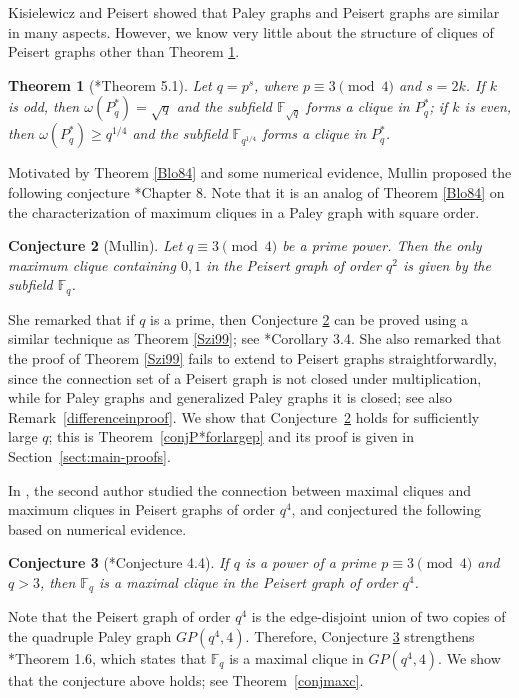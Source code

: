 \documentclass[12pt,reqno]{amsart}
\newtheorem{thm}{Theorem}[section]
\newtheorem{conj}[thm]{Conjecture}
\theoremstyle{definition}
\newcommand{\F}{\mathbb{F}}
\begin{document}
Kisielewicz and Peisert \cite{KP} showed that Paley graphs and Peisert graphs are similar in many aspects. However, we know very little about the structure of cliques of Peisert graphs other than Theorem \ref{KP}.

\begin{thm}[\cite{KP}*{Theorem 5.1}] \label{KP}
Let $q=p^s$, where $p \equiv 3 \pmod 4$ and $s=2k$. If $k$ is odd, then $\omega(P^*_q)= \sqrt{q}$ and the subfield $\F_{\sqrt{q}}$ forms a clique in $P^*_q$; if $k$ is even, then $\omega(P^*_q) \geq q^{1/4}$ and the subfield $\F_{q^{1/4}}$ forms a clique in $P^*_q$.
\end{thm}

Motivated by Theorem \ref{Blo84} and some numerical evidence, Mullin proposed the following conjecture \cite{NM}*{Chapter 8}. Note that it is an analog of Theorem \ref{Blo84} on the characterization of maximum cliques in a Paley graph with square order. 

\begin{conj}[Mullin]\label{conjP*}
Let $q \equiv 3 \pmod 4$ be a prime power. Then the only maximum clique containing $0,1$ in the Peisert graph of order $q^2$ is given by the subfield $\F_q$.
\end{conj}
She remarked that if $q$ is a prime, then Conjecture \ref{conjP*} can be proved using a similar technique as Theorem \ref{Szi99}; see \cite{NM}*{Corollary 3.4}. She also remarked that the proof of Theorem \ref{Szi99} fails to extend to Peisert graphs straightforwardly, since the connection set of a Peisert graph is not closed under multiplication, while for Paley graphs and generalized Paley graphs it is closed; see also Remark~\ref{differenceinproof}. We show that Conjecture~\ref{conjP*} holds for sufficiently large $q$; this is Theorem~\ref{conjP*forlargep} and its proof is given in Section~\ref{sect:main-proofs}.

In \cite{Yip4}, the second author studied the connection between maximal cliques and maximum cliques in Peisert graphs of order $q^4$, and conjectured the following based on numerical evidence. 

\begin{conj}[\cite{Yip3}*{Conjecture 4.4}]\label{conjmaxc*}
If $q$ is a power of a prime $p \equiv 3 \pmod 4$  and $q>3$, then $\F_{q}$ is a maximal clique in the Peisert graph of order $q^4$.
\end{conj}

Note that the Peisert graph of order $q^4$ is the edge-disjoint union of two copies of the quadruple Paley graph $GP(q^4,4)$. Therefore, Conjecture \ref{conjmaxc*} strengthens \cite{Yip3}*{Theorem 1.6}, which states that $\F_{q}$ is a maximal clique in $GP(q^4,4)$. We show that the conjecture above holds; see Theorem~\ref{conjmaxc}.
\end{document}
